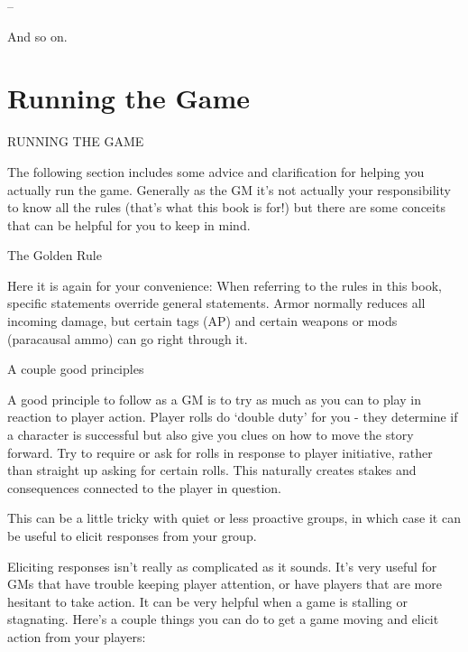 --  

And so on.   

\chapter{Running the Game}
RUNNING THE GAME  

The following section includes some advice and clarification for helping you actually run the  
game. Generally as the GM it’s not actually your responsibility to know all the rules (that’s what  
this book is for!) but there are some conceits that can be helpful for you to keep in mind.
 

                                            The Golden Rule  

Here it is again for your convenience: When referring to the rules in this book, specific  
statements override general statements. Armor normally reduces all incoming damage, but  
certain tags (AP) and certain weapons or mods (paracausal ammo) can go right through it.
 

                                       A couple good principles  

A good principle to follow as a GM is to try as much as you can to play in reaction to player  
action. Player rolls do ‘double duty’ for you - they determine if a character is successful but also  
give you clues on how to move the story forward. Try to require or ask for rolls in response to  
player initiative, rather than straight up asking for certain rolls. This naturally creates stakes and  
consequences connected to the player in question. 
 

This can be a little tricky with quiet or less proactive groups, in which case it can be useful to  
elicit responses from your group.
 

Eliciting responses isn’t really as complicated as it sounds. It’s very useful for GMs that have  
trouble keeping player attention, or have players that are more hesitant to take action. It can be  
very helpful when a game is stalling or stagnating. Here’s a couple things you can do to get a  
game moving and elicit action from your players:
 
